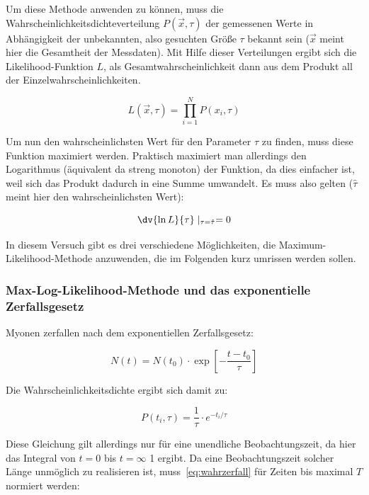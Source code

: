 \documentclass[slug=LM, room=Andreas-Schubert-Bau\,\ K\ 1A, supervisor=Anne-Sophie\ Berthold, coursedate=13.\ 12.\ 2019]{../../Lab_Report_LaTeX/lab_report}
\begin{document}
Um diese Methode anwenden zu können, muss die Wahrscheinlichkeitsdichteverteilung \(P(\vec{x},\tau)\)
der gemessenen Werte in Abhängigkeit der unbekannten, also gesuchten Größe
\(\tau\) bekannt sein (\(\vec{x}\) meint hier die Gesamtheit der Messdaten).
Mit Hilfe dieser Verteilungen ergibt sich die Likelihood-Funktion \(L\), als
Gesamtwahrscheinlichkeit dann aus dem Produkt all der Einzelwahrscheinlichkeiten.

\begin{equation}\label{eq:likefkt}
 L(\vec{x},\tau) = \prod_{i=1}^{N} P(x_i,\tau)
\end{equation}

Um nun den wahrscheinlichsten Wert f\"ur den Parameter \(\tau\) zu finden, muss diese Funktion
maximiert werden. Praktisch maximiert man allerdings den Logarithmus
(\"aquivalent da streng monoton) der Funktion, da dies
einfacher ist, weil sich das Produkt dadurch in eine Summe umwandelt. Es muss also gelten
(\(\hat\tau\) meint hier den wahrscheinlichsten Wert):

\begin{equation}\label{eq:likediff}
 \dv{\ln{L}}{\tau} \mid_{\tau = \hat{\tau}} = 0
\end{equation}

In diesem Versuch gibt es drei verschiedene Möglichkeiten, die Maximum-Likelihood-Methode
anzuwenden, die im Folgenden kurz umrissen werden sollen.

\subsubsection{Max-Log-Likelihood-Methode und das exponentielle Zerfallsgesetz}
\label{eq:likezerfall}

Myonen zerfallen nach dem exponentiellen Zerfallsgesetz:

\begin{equation}\label{eq:zerfall}
 N(t) = N(t_0) \cdot \exp[-\frac{t-t_0}{\tau}]
\end{equation}

Die Wahrscheinlichkeitsdichte ergibt sich damit zu:

\begin{equation}\label{eq:wahrzerfall}
 P(t_i,\tau) = \frac{1}{\tau} \cdot e^{-t_i/\tau}
\end{equation}

Diese Gleichung gilt allerdings nur für eine unendliche Beobachtungszeit, da hier das Integral
von \(t = 0\) bis \(t = \infty\) 1 ergibt.
Da eine Beobachtungszeit solcher Länge unmöglich zu realisieren ist, muss~\ref{eq:wahrzerfall}
für Zeiten bis maximal \(T\) normiert werden:
\end{document}
